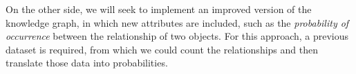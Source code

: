 On the other side, we will seek to implement an improved version of the knowledge graph, in which new attributes are included, such as the \textit{probability of occurrence} between the relationship of two objects. For this approach, a previous dataset is required, from which we could count the relationships and then translate those data into probabilities.



